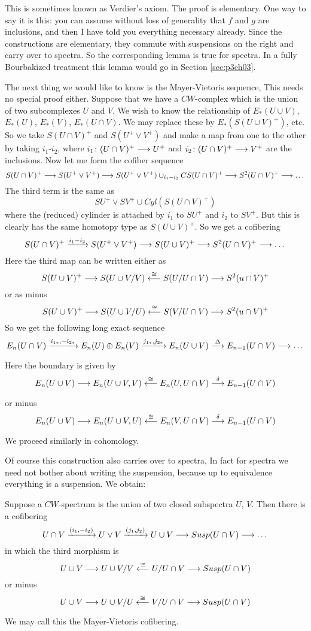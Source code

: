 \documentclass[../main]{subfiles}
\begin{document}
This is sometimes known as Verdier's axiom. The proof is elementary. One way to say it is this: you can assume without loss of generality that $f$ and $g$ are inclusions, and then I have told you everything necessary already. Since the constructions are elementary, they commute with suspensions on the right and carry over to spectra. So the corresponding lemma is true for spectra. In a fully Bourbakized treatment this lemma would go in Section \ref{sec:p3ch03}. 

The next thing we would like to know is the Mayer-Vietoris sequence, This needs no special proof either. Suppose that we have a $CW$-complex which is the union of two subcomplexes $U$ and $V$. We wish to know the relationship of $E_\ast(U\cup V)$, $E_\ast(U)$, $E_\ast(V)$, $E_\ast(U\cap V)$. We may replace these by $E_\ast(S(U\cup V)^+)$, etc. So we take $S(U\cap V)^+$ and $S(U^+\vee V^+)$ and make a map from one to the other by taking $i_1$-$i_2$, where $i_1\colon (U\cap V)^+\longrightarrow U^+$ and $i_2\colon (U\cap V)^+\longrightarrow V^+$ are the inclusions. Now let me form the cofiber sequence
\[S(U\cap V)^+ \longrightarrow S(U^+\vee V^+) \longrightarrow S(U^+\vee V^+)\cup_{i_1-i_2} CS(U\cap V)^+ \longrightarrow S^2(U\cap V)^+\longrightarrow\dots\]
The third term is the same as
\[SU^+\vee SV^+\cup Cyl(S(U\cap V)^+)\]
where the (reduced) cylinder is attached by $i_1$ to $SU^+$ and $i_2$ to $SV^+$. But this is clearly has the same homotopy type as $S(U\cup V)^+$. So we get a cofibering
\[S(U\cap V)^+ \vra{i_1-i_2} S(U^+\vee V^+) \lra S(U\cup V)^+ \lra S^2(U\cap V)^+\lra\dots\]
Here the third map can be written either as
\[S(U\cup V)^+\longrightarrow S(U\cup V/V) \overset{\cong}{\longleftarrow} S(U/U\cap V)\longrightarrow S^2(u\cap V)^+\]
or as minus
\[S(U\cup V)^+\longrightarrow S(U\cup V/U) \overset{\cong}{\longleftarrow} S(V/U\cap V)\longrightarrow S^2(u\cap V)^+\]
So we get the following long exact sequence
\[E_n(U\cap V)\vra{i_{1\ast}, -i_{2\ast}} E_n(U)\oplus E_n(V) \vra{j_{1\ast}, j_{2\ast}} E_n(U\cup V)\vra{\Delta}E_{n-1}(U\cap V) \lra \dots\]
Here the boundary is given by
\[E_n(U\cup V) \lra E_n(U\cup V, V) \lal{\cong}E_n(U, U\cap V)\vra{\delta} E_{n-1}(U\cap V)\]
or minus
\[E_n(U\cup V) \lra E_n(U\cup V, U) \lal{\cong}E_n(V, U\cap V)\vra{\delta} E_{n-1}(U\cap V)\]
We proceed similarly in cohomology.

Of course this construction also carries over to spectra, In fact for spectra we need not bother about writing the suspension, because up to equivalence everything is a suspension. We obtain:
\begin{lemma}\label{lem:p3c06.9}
Suppose a $CW$-spectrum is the union of two closed subspectra $U$, $V$. Then there is a cofibering
\[U\cap V\vra{(i_1, -i_2)}U\vee V \vra{(j_1, j_2)}U\cup V\lra Susp(U\cap V)\lra \dots\]
in which the third morphism is
\[U\cup V\longrightarrow U\cup V/V\overset{\cong}{\longleftarrow}U/U\cap V\longrightarrow Susp(U\cap V)\]
or minus
\[U\cup V\longrightarrow U\cup V/U\overset{\cong}{\longleftarrow}V/U\cap V\longrightarrow Susp(U\cap V)\]
\end{lemma}
We may call this the Mayer-Vietoris cofibering.
\end{document}
